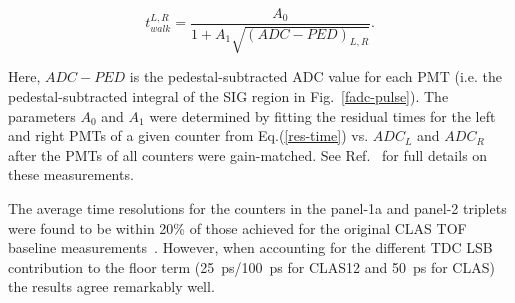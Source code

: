 \documentclass[3p,times,twocolumn]{elsarticle}
\begin{document}
\begin{equation}
\label{walk-function}
t_{walk}^{L,R} = \frac{A_0}{1 + A_1 \sqrt{(ADC - PED)_{L,R}}}.
\end{equation}

\noindent
Here, $ADC - PED$ is the pedestal-subtracted ADC value for each PMT (i.e. the pedestal-subtracted
integral of the SIG region in Fig.~\ref{fadc-pulse}). The parameters $A_0$ and $A_1$ were determined
by fitting the residual times for the left and right PMTs of a given counter from Eq.(\ref{res-time}) vs.
$ADC_L$ and $ADC_R$ after the PMTs of all counters were gain-matched. See Ref.~\cite{dsc-cn2013-001}
for full details on these measurements.

The average time resolutions for the counters in the panel-1a and panel-2 triplets were found to be within
20\% of those achieved for the original CLAS TOF baseline measurements~\cite{tof-nim}. However, when
accounting for the different TDC LSB contribution to the floor term (25~ps/100~ps for CLAS12 and
50~ps for CLAS) the results agree remarkably well.
\end{document}
